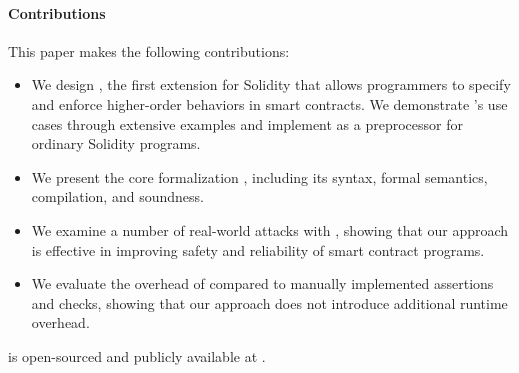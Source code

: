 \paragraph{Contributions} This paper makes the following contributions:
\begin{itemize}
  \item We design \lang, the first extension for Solidity that allows programmers to
        specify and enforce higher-order behaviors in smart contracts.
        We demonstrate \lang's use cases through extensive examples and
        implement \lang as a preprocessor for ordinary Solidity programs.
  \item We present the core formalization \lang, including its syntax, formal
        semantics, compilation, and soundness.
  \item We examine a number of real-world attacks with \lang, showing that our
        approach is effective in improving safety and reliability of smart contract
        programs.
  \item We evaluate the overhead of \lang compared to manually implemented
        assertions and checks, showing that our approach does not introduce
        additional runtime overhead.
\end{itemize}

\lang is open-sourced and publicly available at .

